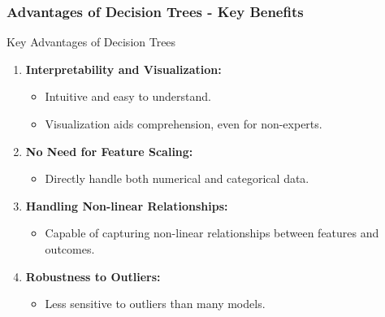\documentclass[aspectratio=169]{beamer}
\begin{document}
\begin{frame}[fragile]
    \frametitle{Advantages of Decision Trees - Key Benefits}
    \begin{block}{Key Advantages of Decision Trees}
        \begin{enumerate}
            \item \textbf{Interpretability and Visualization:}
                \begin{itemize}
                    \item Intuitive and easy to understand.
                    \item Visualization aids comprehension, even for non-experts.
                \end{itemize}
            \item \textbf{No Need for Feature Scaling:}
                \begin{itemize}
                    \item Directly handle both numerical and categorical data.
                \end{itemize}
            \item \textbf{Handling Non-linear Relationships:}
                \begin{itemize}
                    \item Capable of capturing non-linear relationships between features and outcomes.
                \end{itemize}
            \item \textbf{Robustness to Outliers:}
                \begin{itemize}
                    \item Less sensitive to outliers than many models.
                \end{itemize}
        \end{enumerate}
    \end{block}
\end{frame}
\end{document}
